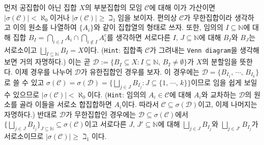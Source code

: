 \begin{enumerate}[label = \textsf{\textbf{\arabic*}}]
    먼저 공집합이 아닌 집합 $X$의 부분집합의 모임 $\mathcal{C}$에 대해 이가 가산이면 $|\sigma(\mathcal{C})|<\aleph_0$이거나 $|\sigma(\mathcal{C})|\geq\beth_1$임을 보이자. 편의상 $\mathcal{C}$가 무한집합이라 생각하고 이의 원소를 나열하여 $\{A_i\}$와 같이 집합열의 형태로 쓰자. 또한, 임의의 $I\subseteq\mathbb{N}$에 대해 집합 $B_I=\bigcap_{i\in I}A_i\cap\bigcap_{i\notin I}A_i^c$를 생각하면 서로다른 $I,\, J\subseteq\mathbb{N}$에 대해 $B_I$와 $B_J$는 서로소이고 $\bigsqcup_{I\subseteq\mathbb{N}}B_I=X$이다. (\texttt{Hint}: 집합족 $\mathcal{C}$가 그려내는 \texttt{Venn diagram}을 생각해보면 거의 자명하다.) 이는 곧 $\mathcal{D}:=\{B_I\subseteq X:I\subseteq\mathbb{N},\,B_I\ne\emptyset\}$가 $X$의 분할임을 뜻한다. 이제 경우를 나누어 $\mathcal{D}$가 유한집합인 경우를 보자. 이 경우에는 $\mathcal{D}=\{B_{I_1},\,\cdots,\,B_{I_k}\}$로 쓸 수 있고 $\sigma(\mathcal{C})=\sigma(\mathcal{D})=\{\bigsqcup_{j\in J}B_{I_j}:J\subseteq\{1,\,\cdots,\,k\}\}$이므로 임을 쉽게 보일 수 있으므로 $|\sigma(\mathcal{C})|<\aleph_0$이다. (\texttt{Hint}: 임의의 $A_i\in\mathcal{C}$에 대해 $A_i$와 교차하는 $\mathcal{D}$의 원소를 골라 이들을 서로소 합집합하면 $A_i$이다. 따라서 $\mathcal{C}\subseteq\sigma(\mathcal{D})$이고, 이제 나머지는 자명하다.) 반대로 $\mathcal{D}$가 무한집합인 경우에는 $\mathcal{D}\subseteq\sigma(\mathcal{C})$에서 $\{\bigsqcup_{j\in J}B_{I_j}\}_{J\subseteq\mathbb{N}}\subseteq\sigma(\mathcal{C})$이고 서로다른 $J,\,J'\subseteq\mathbb{N}$에 대해 $\bigsqcup_{j\in J}B_{I_j}$와 $\bigsqcup_{j\in J'}B_{I_j}$가 서로소이므로 $|\sigma(\mathcal{C})|\geq\beth_1$이다.


\end{enumerate}

